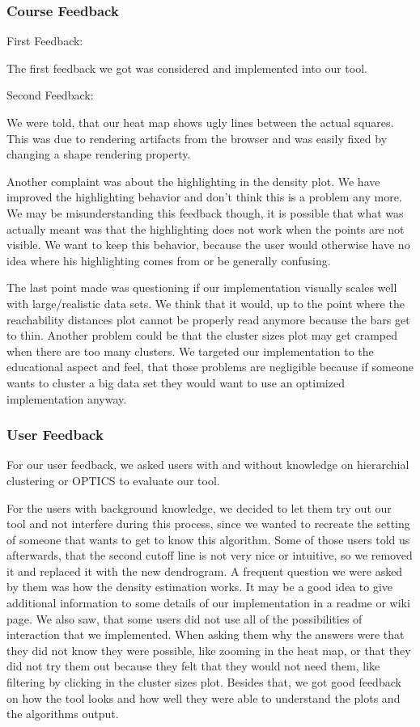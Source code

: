 \documentclass{vgtc} %
\begin{document}
\subsubsection{Course Feedback}

First Feedback:

The first feedback we got was considered and implemented into our tool.

\noindent Second Feedback:

We were told, that our heat map shows ugly lines between the actual squares. This was due to rendering artifacts from the browser and was easily fixed by changing a shape rendering property.

Another complaint was about the highlighting in the density plot. We have improved the highlighting behavior and don't think this is a problem any more. We may be misunderstanding this feedback though, it is possible that what was actually meant was that the highlighting does not work when the points are not visible. We want to keep this behavior, because the user would otherwise have no idea where his highlighting comes from or be generally confusing.

The last point made was questioning if our implementation visually scales well with large/realistic data sets. We think that it would, up to the point where the reachability distances plot cannot be properly read anymore because the bars get to thin. Another problem could be that the cluster sizes plot may get cramped when there are too many clusters. We targeted our implementation to the educational aspect and feel, that those problems are negligible because if someone wants to cluster a big data set they would want to use an optimized implementation anyway.

\subsubsection{User Feedback}
For our user feedback, we asked users with and without knowledge on hierarchial clustering or OPTICS to evaluate our tool.

For the users with background knowledge, we decided to let them try out our tool and not interfere during this process, since we wanted to recreate the setting of someone that wants to get to know this algorithm. Some of those users told us afterwards, that the second cutoff line is not very nice or intuitive, so we removed it and replaced it with the new dendrogram. A frequent question we were asked by them was how the density estimation works. It may be a good idea to give additional information to some details of our implementation in a readme or wiki page. We also saw, that some users did not use all of the possibilities of interaction that we implemented. When asking them why the answers were that they did not know they were possible, like zooming in the heat map, or that they did not try them out because they felt that they would not need them, like filtering by clicking in the cluster sizes plot. Besides that, we got good feedback on how the tool looks and how well they were able to understand the plots and the algorithms output.
\end{document}
